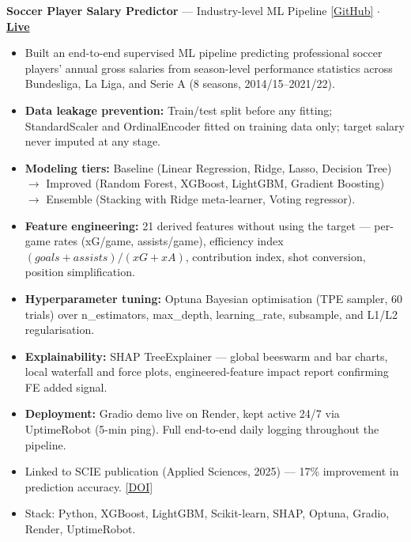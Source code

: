 \documentclass[11pt,a4paper]{article}
\begin{document}
\textbf{Soccer Player Salary Predictor} --- Industry-level ML Pipeline \hfill \href{https://github.com/davronbek-malikov/soccer-xG-salary_prediction}{[GitHub]} $\cdot$ {\large\textbf{\href{https://soccer-xg-salary-prediction.onrender.com}{Live}}}
\begin{itemize}
    \item Built an end-to-end supervised ML pipeline predicting professional soccer players' annual
gross salaries from season-level performance statistics across Bundesliga, La Liga, and
Serie A (8 seasons, 2014/15--2021/22).
    \item \textbf{Data leakage prevention:} Train/test split before any fitting; StandardScaler and OrdinalEncoder fitted on training data only; target salary never imputed at any stage.
    \item \textbf{Modeling tiers:} Baseline (Linear Regression, Ridge, Lasso, Decision Tree) $\rightarrow$ Improved
(Random Forest, XGBoost, LightGBM, Gradient Boosting) $\rightarrow$ Ensemble (Stacking with
Ridge meta-learner, Voting regressor).
    \item \textbf{Feature engineering:} 21 derived features without using the target --- per-game rates
(xG/game, assists/game), efficiency index $(goals+assists)/(xG+xA)$, contribution index,
shot conversion, position simplification.
    \item \textbf{Hyperparameter tuning:} Optuna Bayesian optimisation (TPE sampler, 60 trials) over
n\_estimators, max\_depth, learning\_rate, subsample, and L1/L2 regularisation.
    \item \textbf{Explainability:} SHAP TreeExplainer --- global beeswarm and bar charts, local waterfall
and force plots, engineered-feature impact report confirming FE added signal.
    \item \textbf{Deployment:} Gradio demo live on Render, kept active 24/7 via UptimeRobot (5-min
ping). Full end-to-end daily logging throughout the pipeline.
    \item Linked to SCIE publication (Applied Sciences, 2025) --- 17\% improvement in prediction
accuracy. \href{https://doi.org/10.3390/app15148108}{[DOI]}
    \item Stack: Python, XGBoost, LightGBM, Scikit-learn, SHAP, Optuna, Gradio, Render, UptimeRobot.
\end{itemize}

\medskip
\end{document}
